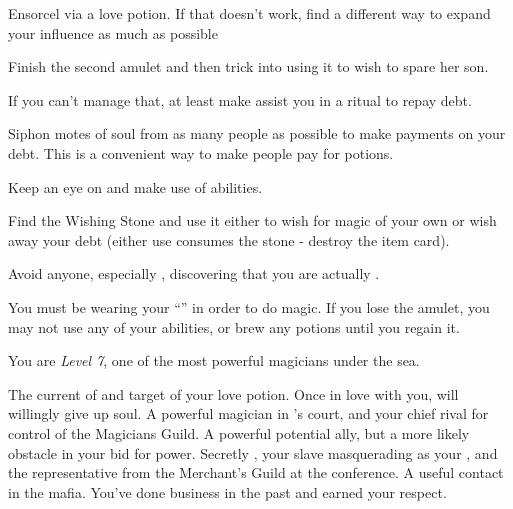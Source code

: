 \documentclass[char]{NeptuneBall}
\begin{document}
\begin{itemz}[Goals]
  \item Ensorcel \cKing{\King} \cKing{} via a love potion. If that doesn't work, find a different way to expand your influence as much as possible
  \item Finish the second amulet and then trick \cAriel{} into using it to wish to spare her son.
  \item If you can't manage that, at least make \cAriel{} assist you in a \gRitual{} ritual to repay \cAriel{\their} debt.
  \item Siphon motes of soul from as many people as possible to make payments on your debt. This is a convenient way to make people pay for potions.
  \item Keep an eye on \cSlave{} and make use of \cSlave{\their} abilities.
	\item Find the Wishing Stone and use it either to wish for magic of your own or wish away your debt (either use consumes the stone - destroy the item card).
  \item Avoid anyone, especially \cKing{}, discovering that you are actually \cWitch{}.
\end{itemz}

\begin{itemz}[Notes]
  \item You must be wearing your ``\iAmulet{}'' in order to do magic. If you lose the amulet, you may not use any of your abilities, or brew any potions until you regain it.
	\item You are \emph{Level 7}, one of the most powerful magicians under the sea.
\end{itemz}

\begin{contacts}
  \contact{\cKing{}} The current \cKing{\King} of \pAtlantis{} and target of your love potion. Once \cKing{\they} \cKing{\are} in love with you, \cKing{\they} will willingly give up \cKing{\their} soul.
  \contact{\cManta{}} A powerful magician in \cKing{}'s court, and your chief rival for control of the Magicians Guild. A powerful potential ally, but a more likely obstacle in your bid for power.
  \contact{\cSlave{\MYname}} Secretly \cSlave{\Prince} \cSlave{}, your slave masquerading as your \cSlave{\sibling}, and the representative from the Merchant's Guild at the conference.
  \contact{\cPriest{}} A useful contact in the mafia. You've done business in the past and \cPriest{\they} \cPriest{\have} earned your respect.
\end{contacts}
\end{document}
